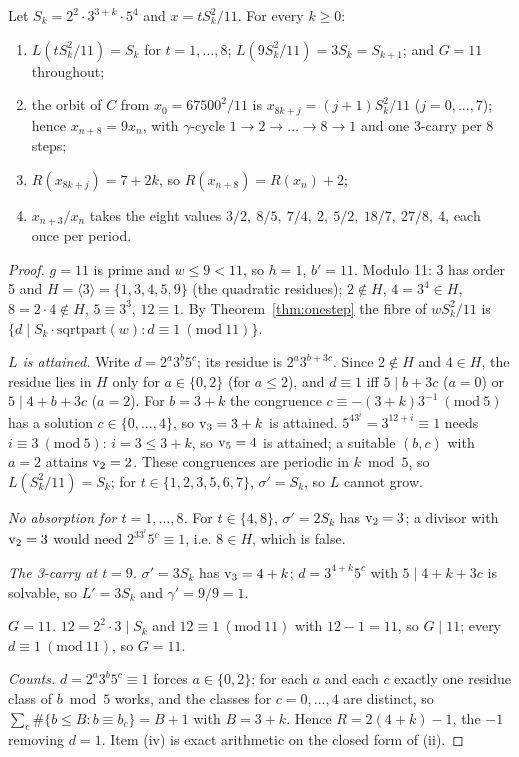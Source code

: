 \begin{theorem}[The eight-step orbit at \(g=11\)]\label{thm:eight}
Let \(S_k=2^2\cdot3^{3+k}\cdot5^4\) and \(x=tS_k^2/11\). For every \(k\ge0\):
\begin{enumerate}[label=(\roman*),nosep]
\item \(L(tS_k^2/11)=S_k\) for \(t=1,\dots,8\); \(L(9S_k^2/11)=3S_k=S_{k+1}\); and \(G=11\) throughout;
\item the orbit of \(C\) from \(x_0=67500^2/11\) is \(x_{8k+j}=(j+1)S_k^2/11\) (\(j=0,\dots,7\)); hence \(x_{n+8}=9x_n\), with \(\gamma\)-cycle \(1\to2\to\dots\to8\to1\) and one 3-carry per 8 steps;
\item \(R(x_{8k+j})=7+2k\), so \(R(x_{n+8})=R(x_n)+2\);
\item \(x_{n+3}/x_n\) takes the eight values \(3/2,\ 8/5,\ 7/4,\ 2,\ 5/2,\ 18/7,\ 27/8,\ 4\), each once per period.
\end{enumerate}
\end{theorem}
\begin{proof}
\(g=11\) is prime and \(w\le9<11\), so \(h=1\), \(b'=11\). Modulo 11: \(3\) has order 5 and \(H=\langle3\rangle=\{1,3,4,5,9\}\) (the quadratic residues); \(2\notin H\), \(4=3^4\in H\), \(8=2\cdot4\notin H\), \(5\equiv3^3\), \(12\equiv1\). By Theorem~\ref{thm:onestep} the fibre of \(wS_k^2/11\) is \(\{d\mid S_k\cdot\mathrm{sqrtpart}(w):d\equiv1\ (\mathrm{mod}\ 11)\}\).

\emph{\(L\) is attained.} Write \(d=2^a3^b5^c\); its residue is \(2^a3^{b+3c}\). Since \(2\notin H\) and \(4\in H\), the residue lies in \(H\) only for \(a\in\{0,2\}\) (for \(a\le2\)), and \(d\equiv1\) iff \(5\mid b+3c\) (\(a=0\)) or \(5\mid4+b+3c\) (\(a=2\)). For \(b=3+k\) the congruence \(c\equiv-(3+k)3^{-1}\ (\mathrm{mod}\ 5)\) has a solution \(c\in\{0,\dots,4\}\), so \(\operatorname{v}_3=3+k\) is attained. \(5^43^i=3^{12+i}\equiv1\) needs \(i\equiv3\ (\mathrm{mod}\ 5)\): \(i=3\le3+k\), so \(\operatorname{v}_5=4\) is attained; a suitable \((b,c)\) with \(a=2\) attains \(\operatorname{v}_2=2\). These congruences are periodic in \(k\bmod5\), so \(L(S_k^2/11)=S_k\); for \(t\in\{1,2,3,5,6,7\}\), \(\sigma'=S_k\), so \(L\) cannot grow.

\emph{No absorption for \(t=1,\dots,8\).} For \(t\in\{4,8\}\), \(\sigma'=2S_k\) has \(\operatorname{v}_2=3\); a divisor with \(\operatorname{v}_2=3\) would need \(2^33^i5^c\equiv1\), i.e. \(8\in H\), which is false.

\emph{The 3-carry at \(t=9\).} \(\sigma'=3S_k\) has \(\operatorname{v}_3=4+k\); \(d=3^{4+k}5^c\) with \(5\mid4+k+3c\) is solvable, so \(L'=3S_k\) and \(\gamma'=9/9=1\).

\emph{\(G=11\).} \(12=2^2\cdot3\mid S_k\) and \(12\equiv1\ (\mathrm{mod}\ 11)\) with \(12-1=11\), so \(G\mid11\); every \(d\equiv1\ (\mathrm{mod}\ 11)\), so \(G=11\).

\emph{Counts.} \(d=2^a3^b5^c\equiv1\) forces \(a\in\{0,2\}\); for each \(a\) and each \(c\) exactly one residue class of \(b\bmod5\) works, and the classes for \(c=0,\dots,4\) are distinct, so \(\sum_c\#\{b\le B:b\equiv b_c\}=B+1\) with \(B=3+k\). Hence \(R=2(4+k)-1\), the \(-1\) removing \(d=1\). Item (iv) is exact arithmetic on the closed form of (ii).
\end{proof}

